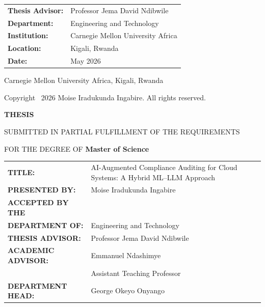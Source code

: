 \documentclass[12pt,oneside]{report}
\begin{document}
\begin{titlepage}
\begin{center}
\begin{tabular}{ll}
\textbf{Thesis Advisor:} & Professor Jema David Ndibwile \\[6pt]
\textbf{Department:} & Engineering and Technology \\[6pt]
\textbf{Institution:} & Carnegie Mellon University Africa \\[6pt]
\textbf{Location:} & Kigali, Rwanda \\[6pt]
\textbf{Date:} & May 2026
\end{tabular}

\vfill

{\large Carnegie Mellon University Africa, Kigali, Rwanda}

\vspace{0.2in}

{\small Copyright \textcopyright\ 2026 Moise Iradukunda Ingabire. All rights reserved.}

\end{center}
\end{titlepage}

\newpage
\thispagestyle{empty}
\begin{center}
\vspace*{0.8in}

{\large\bfseries THESIS}

\vspace{0.3in}

{\large SUBMITTED IN PARTIAL FULFILLMENT OF THE REQUIREMENTS}

\vspace{0.2in}

{\large FOR THE DEGREE OF \textbf{Master of Science}}

\vspace{0.5in}

\begin{tabular}{@{}p{}p{}@{}}
\textbf{TITLE:} & AI-Augmented Compliance Auditing for Cloud Systems: A Hybrid ML--LLM Approach \\[18pt]
\textbf{PRESENTED BY:} & Moise Iradukunda Ingabire \\[18pt]
\textbf{ACCEPTED BY THE} & \\
\textbf{DEPARTMENT OF:} & Engineering and Technology \\[18pt]
\textbf{THESIS ADVISOR:} & Professor Jema David Ndibwile \\[18pt]
\textbf{ACADEMIC ADVISOR:} & Emmanuel Ndashimye \\
                            & Assistant Teaching Professor \\[18pt]
\textbf{DEPARTMENT HEAD:} & George Okeyo Onyango \\
\end{tabular}

\end{center}
\end{document}
